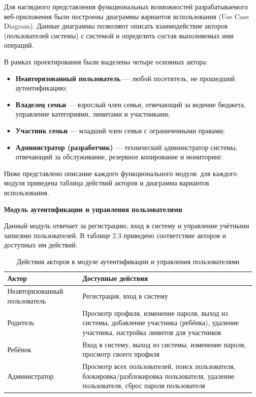 Для наглядного представления функциональных возможностей разрабатываемого веб-приложения были построены диаграммы вариантов использования (Use Case Diagram). Данные диаграммы позволяют описать взаимодействие акторов (пользователей системы) с системой и определить состав выполняемых ими операций.

В рамках проектирования были выделены четыре основных актора:
\begin{itemize}
    \item \textbf{Неавторизованный пользователь} — любой посетитель, не прошедший аутентификацию;
    \item \textbf{Владелец семьи} — взрослый член семьи, отвечающий за ведение бюджета, управление категориями, лимитами и участниками;
    \item \textbf{Участник семьи} — младший член семьи с ограниченными правами;
    \item \textbf{Администратор (разработчик)} — технический администратор системы, отвечающий за обслуживание, резервное копирование и мониторинг.
\end{itemize}

Ниже представлено описание каждого функционального модуля: для каждого модуля приведена таблица действий акторов и диаграмма вариантов использования.

\textbf{Модуль аутентификации и управления пользователями}

Данный модуль отвечает за регистрацию, вход в систему и управление учётными записями пользователей. В таблице 2.3 приведено соответствие акторов и доступных им действий.

\begin{table}[H]
    \centering
    \caption{Действия акторов в модуле аутентификации и управления пользователями}
    \label{tab:auth-actions}

    {\fontsize{12}{14}\selectfont
	\setlength{\tabcolsep}{6pt}

    \begin{tabular}{|p{3.5cm}|p{10.5cm}|}
    \hline
    \textbf{Актор} & \textbf{Доступные действия} \\
    \hline
    Неавторизованный пользователь & Регистрация, вход в систему \\
    \hline
    Родитель & Просмотр профиля, изменение пароля, выход из системы, добавление участника (ребёнка), удаление участника, настройка лимитов для участников \\
    \hline
    Ребёнок & Вход в систему, выход из системы, изменение пароля, просмотр своего профиля \\
    \hline
    Администратор & Просмотр всех пользователей, поиск пользователя, блокировка/разблокировка пользователя, удаление пользователя, сброс пароля пользователя \\
    \hline
    \end{tabular}
    }
\end{table}

